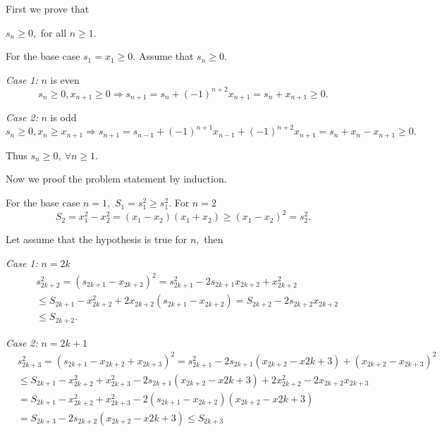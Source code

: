 \documentclass{article}
\begin{document}
\begin{soln}
    First we prove that 
    \begin{claim*}
        $s_n \ge 0,$ for all $n \ge 1.$
    \end{claim*}
    \begin{subproof}
        For the base case $s_1 = x_1 \ge 0.$ Assume that $s_n \ge 0.$
        
        \textit{Case 1:} $n$ is even
        \[
            s_n \ge 0, x_{n+1} \ge 0 \Rightarrow s_{n+1} = s_n + (-1)^{n+2}x_{n+1} = s_n + x_{n+1} \ge 0.
        \]

        \textit{Case 2:} $n$ is odd
        \[
            s_n \ge 0, x_{n} \ge x_{n+1} \Rightarrow s_{n+1} = s_{n-1} + (-1)^{n+1}x_{n-1} + (-1)^{n+2}x_{n+1} = s_n + x_{n} - x_{n+1} \ge 0.
        \]
    
        Thus $s_n \ge 0,\ \forall n\ge 1.$
    \end{subproof}
    
    Now we proof the problem statement by induction.

    For the base case $n=1,$ $S_1 = s_1^2 \ge s_1^2.$ For $n=2$
    \[
        S_2 = x_1^2 - x_2^2 = (x_1-x_2)(x_1 + x_2) \ge (x_1-x_2)^2 = s_2^2.
    \]

    Let assume that the hypothesis is true for $n,$ then
    
    \textit{Case 1:} $n=2k$
    \[
        \begin{aligned}
            &s_{2k+2}^2 = (s_{2k+1} - x_{2k+2})^2
            = s_{2k+1}^2 - 2 s_{2k+1}x_{2k+2}  + x_{2k+2}^2\\
            &\le S_{2k+1} - x_{2k+2}^2 + 2 x_{2k+2}(s_{2k+1} -x_{2k+2})
            = S_{2k+2} - 2s_{2k+2}x_{2k+2}\\
            &\le S_{2k+2}.
        \end{aligned}
    \]

    \textit{Case 2:} $n=2k+1$
    \[
        \begin{aligned}
            &s_{2k+3}^2 = (s_{2k+1} - x_{2k+2} + x_{2k+3})^2
            = s_{2k+1}^2 - 2 s_{2k+1}(x_{2k+2} - x{2k+3}) + (x_{2k+2} - x_{2k+3})^2\\
            &\le S_{2k+1} - x_{2k+2}^2 + x_{2k+3}^2 - 2 s_{2k+1}(x_{2k+2} - x{2k+3}) + 2x_{2k+2}^2 - 2x_{2k+2}x_{2k+3}\\
            &= S_{2k+1} - x_{2k+2}^2 + x_{2k+3}^2 - 2(s_{2k+1} - x_{2k+2})(x_{2k+2} - x{2k+3})\\
            &= S_{2k+3} - 2s_{2k+2}(x_{2k+2} - x{2k+3})
            \le S_{2k+3}
        \end{aligned}
    \]
\end{soln}
\end{document}
